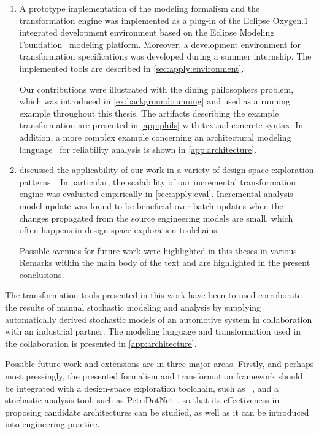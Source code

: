 \begin{enumerate}
\item A prototype implementation of the modeling formalism and the transformation engine was implemented as a plug-in of the Eclipse Oxygen.1 integrated development environment based on the Eclipse Modeling Foundation~\citep{Steinberg09emf} modeling platform. Moreover, a development environment for transformation specifications was developed during a summer internship. The implemented tools are described in \vref{sec:apply:environment}.

  Our contributions were illustrated with the dining philosophers problem, which was introduced in \vref{ex:background:running} and used as a running example throughout this thesis. The artifacts describing the example transformation are presented in \vref{app:phils} with textual concrete syntax. In addition, a more complex example concerning an architectural modeling language~\citep{Ecsedi16architecture} for reliability analysis is shown in \vref{app:architecture}.

\item {} discussed the applicability of our work in a variety of design-space exploration patterns~\citep{Vanherpen14patterns}. In particular, the scalability of our incremental transformation engine was evaluated empirically in \vref{sec:apply:eval}. Incremental analysis model update was found to be beneficial over batch updates when the changes propagated from the source engineering models are small, which often happens in design-space exploration toolchains. 

  Possible avenues for future work were highlighted in this theses in various Remarks within the main body of the text and are highlighted in the present conclusions.
\end{enumerate}

The transformation tools presented in this work have been to used corroborate the results of manual stochastic modeling and analysis by supplying automatically derived stochastic models of an automotive system in collaboration with an industrial partner. The modeling language and transformation used in the collaboration is presented in \cref{app:architecture}.

Possible future work and extensions are in three major areas. Firstly, and perhaps most pressingly, the presented formalism and transformation framework should be integrated with a design-space exploration toolchain, such as ~\citep{Hegedus13guided}, and a stochastic analysis tool, such as PetriDotNet~\citep{Voros17pdn}, so that its effectiveness in proposing candidate architectures can be studied, as well as it can be introduced into engineering practice.

